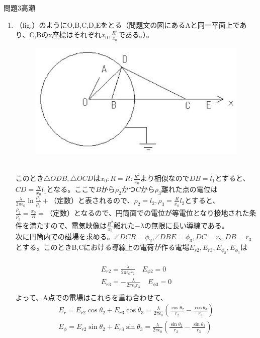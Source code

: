 \documentclass[fleqn]{jbook}
\begin{document}
\begin{answer}{問題3}{高瀬}
\begin{enumerate}
	\item
	（fig.）のようにO,B,C,D,Eをとる（問題文の図にあるAと同一平面上であり、C,Bのx座標はそれぞれ$x_0,\frac{R^2}{x_0}$である。）。\\
	\begin{figure}[htbp]
 		\begin{center}
   		\includegraphics[width = .7\linewidth]{2002phy3a.eps}
   		\caption{} 
 		\end{center}
	\end{figure}
	\\
	このとき$\triangle ODB,\triangle OCD$は$x_0:R=R:\frac{R^2}{x_0}$より相似なので$DB=l_1$とすると、$CD=\frac{R}{x_0} l_1$となる。ここで$Bから\rho_2$かつ$Cから\rho_3$離れた点の電位は$\frac{\lambda}{2 \pi \epsilon_0} \ln \frac{\rho_2}{\rho_3} +（定数）$と表されるので、$\rho_2 = l_2, \rho_3 = \frac{R}{x_0} l_2$とすると、$\frac{\rho_2}{\rho_3} = \frac{x_0}{R} = （定数）$となるので、円筒面での電位が等電位となり接地された条件を満たすので、電気映像は$\frac{R^2}{x_0}$離れた$-\lambda$の無限に長い導線である。
	\\
	次に円筒内での磁場を求める。$\angle DCB=\phi_2$,$\angle DBE = \phi_3,DC=r_2,DB=r_3$とする。このときB,Cにおける導線上の電荷が作る電場$E_{r2},E_{r3},E_{\phi_2},E_{\phi_3}$は
　　\begin{eqnarray}
		E_{r2} = \frac{\lambda}{2 \pi \epsilon_0 r_2} \quad E_{\phi2} = 0 \\
		E_{r3} = -\frac{\lambda}{2 \pi \epsilon_0 r_3} \quad E_{\phi3} = 0 \\
	\end{eqnarray}
	よって、A点での電場はこれらを重ね合わせて、
	\begin{eqnarray}
		E_r = E_{r2} \cos \theta_2 + E_{r3} \cos \theta_3
			= \frac{\lambda}{2 \pi \epsilon_0} 
			(\frac{\cos \theta_2}{r_2}-\frac{\cos \theta_3}{r_3}) \\
		E_\phi = E_{r2} \sin \theta_2 + E_{r3} \sin \theta_3
			= \frac{\lambda}{2 \pi \epsilon_0} 
			(\frac{\sin \theta_2}{r_2}-\frac{\sin \theta_3}{r_3}) \\

\end{eqnarray}
\end{enumerate}
\end{answer}
\end{document}
